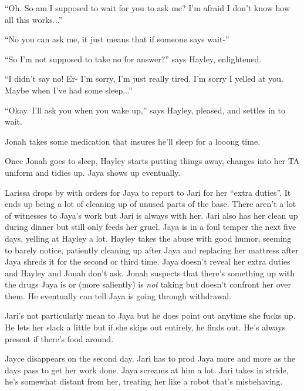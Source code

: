 ``Oh.  So am I supposed to wait for you to ask me?  I'm afraid I don't know how all this works...''

``No you can ask me, it just means that if someone says wait-''

``So I'm not supposed to take no for answer?'' says Hayley, enlightened.

``I didn't say no!  Er- I'm sorry, I'm just really tired.  I'm sorry I yelled at you.  Maybe when I've had some sleep...''

``Okay.  I'll ask you when you wake up,'' says Hayley, pleased, and settles in to wait.

Jonah takes some medication that insures he'll sleep for a looong time.



Once Jonah goes to sleep, Hayley starts putting things away, changes into her TA uniform and tidies up.  Jaya shows up eventually.





Larissa drops by with orders for Jaya to report to Jari for her ``extra duties''.  It ends up being a lot of cleaning up of unused parts of the base.  There aren't a lot of witnesses to Jaya's work but Jari is always with her.  Jari also has her clean up during dinner but still only feeds her gruel.  Jaya is in a foul temper the next five days, yelling at Hayley a lot.  Hayley takes the abuse with good humor, seeming to barely notice, patiently cleaning up after Jaya and replacing her mattress after Jaya shreds it for the second or third time.  Jaya doesn't reveal her extra duties and Hayley and Jonah don't ask.  Jonah suspects that there's something up with the drugs Jaya is or (more saliently) is \textit{not} taking but doesn't confront her over them. He eventually can tell Jaya is going through withdrawal.



Jari's not particularly mean to Jaya but he does point out anytime she fucks up.  He lets her slack a little but if she skips out entirely, he finds out.  He's always present if there's food around.



Jayce disappears on the second day.  Jari has to prod Jaya more and more as the days pass to get her work done.  Jaya screams at him a lot.  Jari takes in stride, he's somewhat distant from her, treating her like a robot that's misbehaving.




